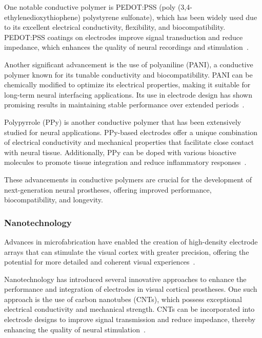 \documentclass[twocolumn,10pt]{article}
\begin{document}
One notable conductive polymer is PEDOT:PSS (poly (3,4-ethylenedioxythiophene)
polystyrene sulfonate), which has been widely used due to its excellent
electrical conductivity, flexibility, and biocompatibility. PEDOT:PSS coatings
on electrodes improve signal transduction and reduce impedance, which enhances
the quality of neural recordings and
stimulation~\parencite{rivnayHighperformanceTransistorsBioelectronics2015}.

Another significant advancement is the use of polyaniline (PANI), a conductive
polymer known for its tunable conductivity and biocompatibility. PANI can be
chemically modified to optimize its electrical properties, making it suitable
for long-term neural interfacing applications. Its use in electrode design has
shown promising results in maintaining stable performance over extended
periods~\parencite{almuflehHighlyFlexiblePolyanilineBased2021}.

Polypyrrole (PPy) is another conductive polymer that has been extensively
studied for neural applications. PPy-based electrodes offer a unique combination
of electrical conductivity and mechanical properties that facilitate close
contact with neural tissue. Additionally, PPy can be doped with various
bioactive molecules to promote tissue integration and reduce inflammatory
responses~\parencite{zareElectroconductiveMultifunctionalPolypyrrole2021a}.

These advancements in conductive polymers are crucial for the development of
next-generation neural prostheses, offering improved performance,
biocompatibility, and longevity.

\subsubsection*{Nanotechnology}
Advances in microfabrication have enabled the creation of high-density electrode
arrays that can stimulate the visual cortex with greater precision, offering the
potential for more detailed and coherent visual
experiences~\parencite{ryuSpatiallyConfinedResponses2020}.

Nanotechnology has introduced several innovative approaches to enhance the
performance and integration of electrodes in visual cortical prostheses. One
such approach is the use of carbon nanotubes (CNTs), which possess exceptional
electrical conductivity and mechanical strength. CNTs can be incorporated into
electrode designs to improve signal transmission and reduce impedance, thereby
enhancing the quality of neural
stimulation~\parencite{alegretThreeDimensionalConductiveScaffolds2018}.
\end{document}
